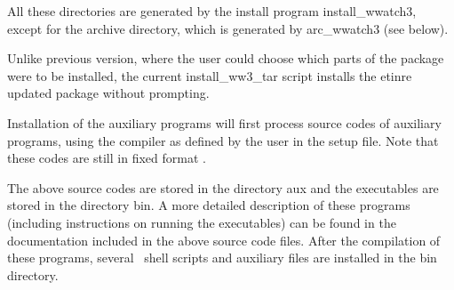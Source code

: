 \noindent
All these directories are generated by the install program {\file
install\_wwatch3}, except for the archive directory, which is generated by
{\file arc\_wwatch3} (see below).

Unlike previous version, where the user could choose which parts of the
package were to be installed, the current {\file install\_ww3\_tar} script
installs the etinre updated package without prompting. 

Installation of the auxiliary programs will first process source codes of
auxiliary programs, using the compiler as defined by the user in the setup
file. Note that these codes are still in fixed format .

\begin{flist}


\end{flist}

\noindent
The above source codes are stored in the directory {\dir aux} and the
executables are stored in the directory {\dir bin}. A more detailed
description of these programs (including instructions on running the
executables) can be found in the documentation included in the above source
code files. After the compilation of these programs, several \unix\ shell
scripts and auxiliary files are installed in the {\dir bin} directory.

